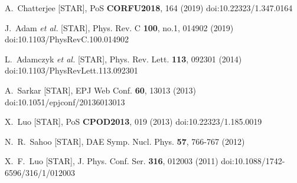 \begin{thebibliography}{99}
A.~Chatterjee [STAR],
PoS \textbf{CORFU2018}, 164 (2019)
doi:10.22323/1.347.0164

J.~Adam \textit{et al.} [STAR],
Phys. Rev. C \textbf{100}, no.1, 014902 (2019)
doi:10.1103/PhysRevC.100.014902

L.~Adamczyk \textit{et al.} [STAR],
Phys. Rev. Lett. \textbf{113}, 092301 (2014)
doi:10.1103/PhysRevLett.113.092301

A.~Sarkar [STAR],
EPJ Web Conf. \textbf{60}, 13013 (2013)
doi:10.1051/epjconf/20136013013

X.~Luo [STAR],
PoS \textbf{CPOD2013}, 019 (2013)
doi:10.22323/1.185.0019

N.~R.~Sahoo [STAR],
DAE Symp. Nucl. Phys. \textbf{57}, 766-767 (2012)

X.~F.~Luo [STAR],
J. Phys. Conf. Ser. \textbf{316}, 012003 (2011)
doi:10.1088/1742-6596/316/1/012003


\end{thebibliography}
